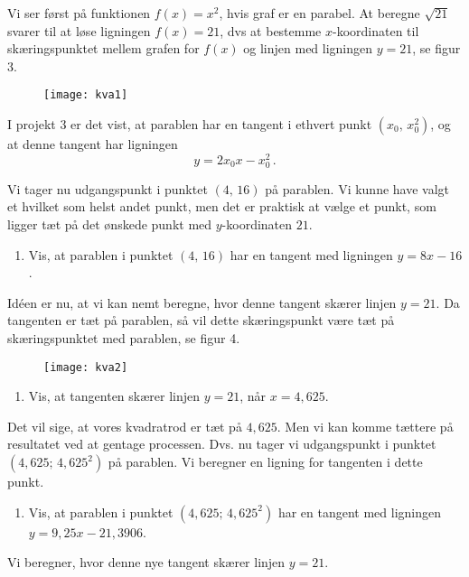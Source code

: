 \documentclass[12pt,oneside,a4paper]{article}
\theoremstyle{plain}
\begin{document}
Vi ser først på funktionen $f(x) = x^2$, hvis graf er en parabel.
At beregne $\sqrt{21}$ svarer til at løse ligningen $f(x) = 21$, dvs at 
bestemme $x$-koordinaten til skæringspunktet mellem grafen for $f(x)$
og linjen med ligningen $y=21$, se figur 3.

\begin{figure}[ht]
    \centering
    \texttt{[image: kva1]}
    \caption{}
    \label{fig1}
\end{figure}

I projekt 3 er det vist, at parablen har en tangent i ethvert punkt $(x_0,\,
x_0^2)$, og at denne tangent har ligningen
\[
    y=2x_0x - x_0^2 \,.
\]

Vi tager nu udgangspunkt i punktet $(4,\,16)$ på parablen. Vi kunne have valgt
et hvilket som helst andet punkt, men det er praktisk at vælge et punkt, som
ligger tæt på det ønskede punkt med $y$-koordinaten $21$.

\begin{enumerate}[label=(\alph*)]
    \item Vis, at parablen i punktet $(4,\,16)$ har en tangent med ligningen
        $y=8x-16$.
\end{enumerate}

Idéen er nu, at vi kan nemt beregne, hvor denne tangent skærer linjen $y=21$. 
Da tangenten er tæt på parablen, så vil dette skæringspunkt være tæt på 
skæringspunktet med parablen, se figur 4.

\begin{figure}[H]
    \centering
    \texttt{[image: kva2]}
    \caption{}
    \label{fig2}
\end{figure}

\begin{enumerate}[label=(\alph*), resume]
    \item Vis, at tangenten skærer linjen $y=21$, når $x=4,625$.
\end{enumerate}

Det vil sige, at vores kvadratrod er tæt på $4,625$. Men vi kan komme tættere
på resultatet ved at gentage processen. Dvs. nu tager vi udgangspunkt i punktet
$(4,625;\,4,625^2)$ på parablen. Vi beregner en ligning for tangenten i dette
punkt.

\begin{enumerate}[label=(\alph*), resume]
    \item Vis, at parablen i punktet $(4,625;\,4,625^2)$ har en tangent med
        ligningen $y=9,25x-21,3906$.
\end{enumerate}
Vi beregner, hvor denne nye tangent skærer linjen $y=21$.
\end{document}

